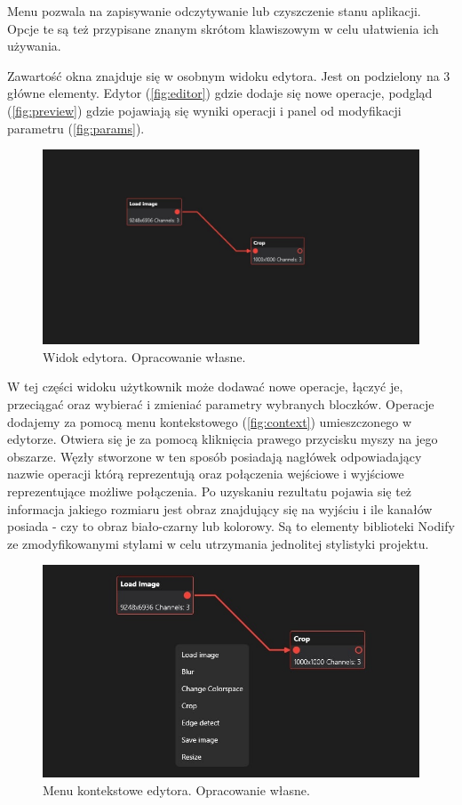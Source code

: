 Menu pozwala na zapisywanie odczytywanie lub czyszczenie stanu aplikacji. 
Opcje te są też przypisane znanym skrótom klawiszowym w celu ułatwienia ich używania.

Zawartość okna znajduje się w osobnym widoku edytora. Jest on podzielony na 3 główne elementy. Edytor (\autoref{fig:editor}) gdzie dodaje się nowe operacje, podgląd (\autoref{fig:preview}) gdzie pojawiają się wyniki operacji i panel od modyfikacji parametru (\autoref{fig:params}).

\begin{figure}[H]
    \centering
    \includegraphics[width=1\linewidth]{images/Picture15.jpg}
    \caption{Widok edytora. Opracowanie własne.}
    \label{fig:editor}
\end{figure}

W tej części widoku użytkownik może dodawać nowe operacje, łączyć je, przeciągać oraz wybierać i zmieniać parametry wybranych bloczków. 
Operacje dodajemy za pomocą menu kontekstowego (\autoref{fig:context}) umieszczonego w edytorze. 
Otwiera się je za pomocą kliknięcia prawego przycisku myszy na jego obszarze.
Węzły stworzone w ten sposób posiadają nagłówek odpowiadający nazwie operacji którą reprezentują oraz połączenia wejściowe i wyjściowe reprezentujące możliwe połączenia.
Po uzyskaniu rezultatu pojawia się też informacja jakiego rozmiaru jest obraz znajdujący się na wyjściu i ile kanałów posiada - czy to obraz biało-czarny lub kolorowy.
Są to elementy biblioteki Nodify \cite{nodify} ze zmodyfikowanymi stylami w celu utrzymania jednolitej stylistyki projektu.

\begin{figure}[H]
    \centering
    \includegraphics[width=0.6\linewidth]{images/Picture18.jpg}
    \caption{Menu kontekstowe edytora. Opracowanie własne.}
    \label{fig:context}
\end{figure}


